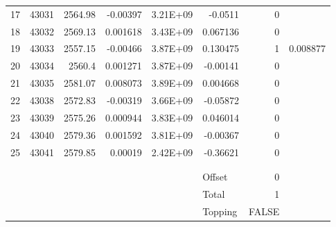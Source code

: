 \documentclass{article}
\begin{document}
\begin{table}[htbp]
\begin{tabular}{rrrrrlrr}
    17    & 43031 & 2564.98 & -0.00397 & 3.21E+09 & \multicolumn{1}{r}{-0.0511} & 0     &  \\
    18    & 43032 & 2569.13 & 0.001618 & 3.43E+09 & \multicolumn{1}{r}{0.067136} & 0     &  \\
    19    & 43033 & 2557.15 & -0.00466 & 3.87E+09 & \multicolumn{1}{r}{0.130475} & 1     & 0.008877 \\
    20    & 43034 & 2560.4 & 0.001271 & 3.87E+09 & \multicolumn{1}{r}{-0.00141} & 0     &  \\
    21    & 43035 & 2581.07 & 0.008073 & 3.89E+09 & \multicolumn{1}{r}{0.004668} & 0     &  \\
    22    & 43038 & 2572.83 & -0.00319 & 3.66E+09 & \multicolumn{1}{r}{-0.05872} & 0     &  \\
    23    & 43039 & 2575.26 & 0.000944 & 3.83E+09 & \multicolumn{1}{r}{0.046014} & 0     &  \\
    24    & 43040 & 2579.36 & 0.001592 & 3.81E+09 & \multicolumn{1}{r}{-0.00367} & 0     &  \\
    25    & 43041 & 2579.85 & 0.00019 & 2.42E+09 & \multicolumn{1}{r}{-0.36621} & 0     &  \\
          &       &       &       &       &       &       &  \\
          &       &       &       &       &       &       &  \\
          &       &       &       &       & Offset & 0     &  \\
          &       &       &       &       & Total & 1     &  \\
          &       &       &       &       & Topping & FALSE &  \\
    \end{tabular}%
  \label{tab:addlabel}%
\end{table}%
\end{document}
